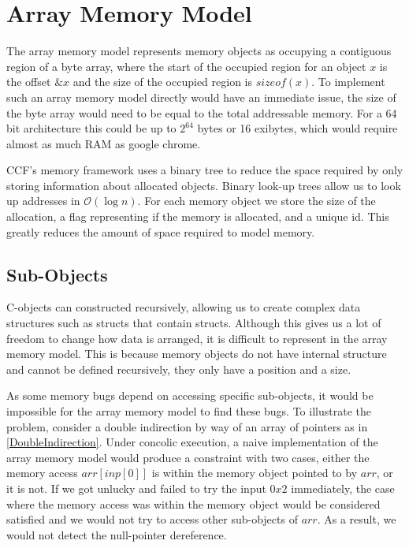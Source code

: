\documentclass[12pt,twoside]{report}
\begin{document}
\section{Array Memory Model}
The array memory model represents memory objects as occupying a contiguous region of a byte array, where the start of the occupied region for an object $x$ is the offset $\&x$ and the size of the occupied region is $sizeof(x)$. To implement such an array memory model directly would have an immediate issue, the size of the byte array would need to be equal to the total addressable memory. For a 64 bit architecture this could be up to $2^64$ bytes or 16 exibytes, which would require almost as much RAM as google chrome. 

CCF's memory framework uses a binary tree to reduce the space required by only storing information about allocated objects. Binary look-up trees allow us to look up addresses in $\mathcal{O}(\log{}n)$. For each memory object we store the size of the allocation, a flag representing if the memory is allocated, and a unique id. This greatly reduces the amount of space required to model memory.

\subsection{Sub-Objects}
C-objects can constructed recursively, allowing us to create complex data structures such as structs that contain structs. Although this gives us a lot of freedom to change how data is arranged, it is difficult to represent in the array memory model. This is because memory objects do not have internal structure and cannot be defined recursively, they only have a position and a size.

As some memory bugs depend on accessing specific sub-objects, it would be impossible for the array memory model to find these bugs. To illustrate the problem, consider a double indirection by way of an array of pointers as in \ref{DoubleIndirection}. Under concolic execution, a naive implementation of the array memory model would produce a constraint with two cases, either the memory access $arr[inp[0]]$ is within the memory object pointed to by $arr$, or it is not. If we got unlucky and failed to try the input $0x2$ immediately, the case where the memory access was within the memory object would be considered satisfied and we would not try to access other sub-objects of $arr$. As a result, we would not detect the null-pointer dereference.
\end{document}
